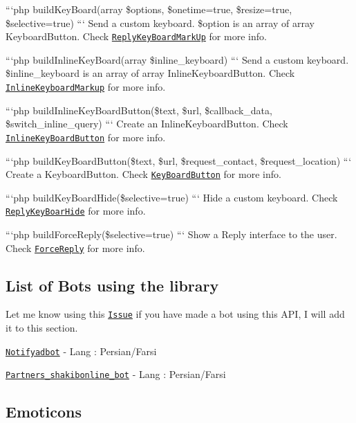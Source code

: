 ```php build\-Key\-Board(array \$options, \$onetime=true, \$resize=true, \$selective=true) ``` Send a custom keyboard. \$option is an array of array Keyboard\-Button. Check \href{https://core.telegram.org/bots/api#replykeyboardmarkup}{\tt Reply\-Key\-Board\-Mark\-Up} for more info.

```php build\-Inline\-Key\-Board(array \$inline\-\_\-keyboard) ``` Send a custom keyboard. \$inline\-\_\-keyboard is an array of array Inline\-Keyboard\-Button. Check \href{https://core.telegram.org/bots/api#inlinekeyboardmarkup}{\tt Inline\-Keyboard\-Markup} for more info.

```php build\-Inline\-Key\-Board\-Button(\$text, \$url, \$callback\-\_\-data, \$switch\-\_\-inline\-\_\-query) ``` Create an Inline\-Keyboard\-Button. Check \href{https://core.telegram.org/bots/api#inlinekeyboardbutton}{\tt Inline\-Key\-Board\-Button} for more info.

```php build\-Key\-Board\-Button(\$text, \$url, \$request\-\_\-contact, \$request\-\_\-location) ``` Create a Keyboard\-Button. Check \href{https://core.telegram.org/bots/api#keyboardbutton}{\tt Key\-Board\-Button} for more info.

```php build\-Key\-Board\-Hide(\$selective=true) ``` Hide a custom keyboard. Check \href{https://core.telegram.org/bots/api#replykeyboardhide}{\tt Reply\-Key\-Boar\-Hide} for more info.

```php build\-Force\-Reply(\$selective=true) ``` Show a Reply interface to the user. Check \href{https://core.telegram.org/bots/api#forcereply}{\tt Force\-Reply} for more info.

\subsection*{List of Bots using the library }

Let me know using this \href{https://github.com/Eleirbag89/TelegramBotPHP/issues/80}{\tt Issue} if you have made a bot using this A\-P\-I, I will add it to this section.
\begin{DoxyItemize}
\item \href{https://telegram.me/notifyadbot}{\tt Notifyadbot} -\/ Lang \-: Persian/\-Farsi
\item \href{https://telegram.me/Partners_shakibonline_bot}{\tt Partners\-\_\-shakibonline\-\_\-bot} -\/ Lang \-: Persian/\-Farsi
\end{DoxyItemize}

\subsection*{Emoticons }

